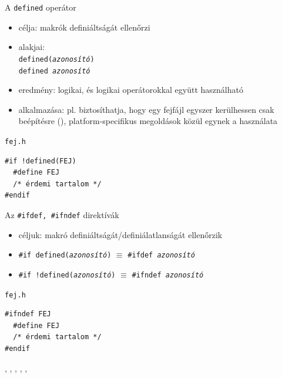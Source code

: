 \documentclass[usenames,dvipsnames,aspectratio=169]{beamer}
\begin{document}
\begin{frame}[fragile]
  \small
  A \texttt{defined} operátor
  \begin{itemize}
    \item célja: makrók definiáltságát ellenőrzi
    \item alakjai:\\
\texttt{defined(\emph{azonosító})}\\
\texttt{defined \emph{azonosító}}
    \item eredmény: logikai, és logikai operátorokkal együtt használható
    \item alkalmazása: pl. biztosíthatja, hogy egy fejfájl egyszer kerülhessen csak beépítésre (), platform-specifikus megoldások közül egynek a használata
  \end{itemize}
  \begin{exampleblock}{\texttt{fej.h}}
    \vspace{-.4cm}
    \begin{verbatim}
#if !defined(FEJ)
  #define FEJ
  /* érdemi tartalom */
#endif
\end{verbatim}
    \vspace{-.3cm}
  \end{exampleblock}
\end{frame}

\begin{frame}[fragile]
  Az \texttt{\#ifdef, \#ifndef} direktívák
  \begin{itemize}
    \item céljuk: makró definiáltságát/definiálatlanságát ellenőrzik
    \item \texttt{\#if defined(\emph{azonosító})} $\equiv$ \texttt{\#ifdef \emph{azonosító}}
    \item \texttt{\#if !defined(\emph{azonosító})} $\equiv$ \texttt{\#ifndef \emph{azonosító}}
  \end{itemize}
    \begin{exampleblock}{\texttt{fej.h}}
    \begin{verbatim}
#ifndef FEJ
  #define FEJ
  /* érdemi tartalom */
#endif
\end{verbatim}
  \end{exampleblock}
\end{frame}

\begin{frame}
  \begin{exampleblock}{}
    \vspace{-.2cm}
    
    
    \vspace{-.2cm}
  \end{exampleblock}
  , , , 
  , , 
\end{frame}
\end{document}
